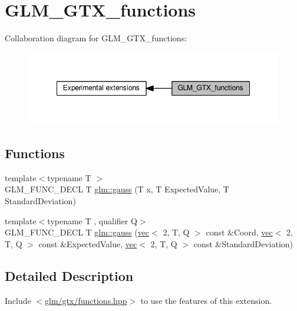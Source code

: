 \hypertarget{group__gtx__functions}{}\section{G\+L\+M\+\_\+\+G\+T\+X\+\_\+functions}
\label{group__gtx__functions}
Collaboration diagram for G\+L\+M\+\_\+\+G\+T\+X\+\_\+functions\+:
\nopagebreak
\begin{figure}[H]
\begin{center}
\leavevmode
\includegraphics[width=348pt]{d6/dab/group__gtx__functions}
\end{center}
\end{figure}
\subsection*{Functions}
\begin{DoxyCompactItemize}
\item 
{\footnotesize template$<$typename T $>$ }\\G\+L\+M\+\_\+\+F\+U\+N\+C\+\_\+\+D\+E\+CL T \hyperlink{group__gtx__functions_ga0b50b197ff74261a0fad90f4b8d24702}{glm\+::gauss} (T x, T Expected\+Value, T Standard\+Deviation)
\item 
{\footnotesize template$<$typename T , qualifier Q$>$ }\\G\+L\+M\+\_\+\+F\+U\+N\+C\+\_\+\+D\+E\+CL T \hyperlink{group__gtx__functions_gad19ec8754a83c0b9a8dc16b7e60705ab}{glm\+::gauss} (\hyperlink{structglm_1_1vec}{vec}$<$ 2, T, Q $>$ const \&Coord, \hyperlink{structglm_1_1vec}{vec}$<$ 2, T, Q $>$ const \&Expected\+Value, \hyperlink{structglm_1_1vec}{vec}$<$ 2, T, Q $>$ const \&Standard\+Deviation)
\end{DoxyCompactItemize}


\subsection{Detailed Description}
Include $<$\hyperlink{functions_8hpp}{glm/gtx/functions.\+hpp}$>$ to use the features of this extension.

